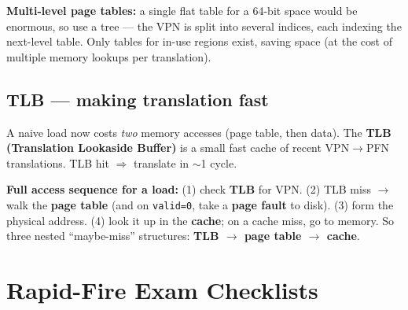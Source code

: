 \documentclass[10pt]{article}
\newcommand{\code}[1]{\texttt{\small #1}}
\begin{document}
\textbf{Multi-level page tables:} a single flat table for a 64-bit space would be enormous, so use
a tree --- the VPN is split into several indices, each indexing the next-level table. Only tables
for in-use regions exist, saving space (at the cost of multiple memory lookups per translation).

\subsection{TLB --- making translation fast}
\begin{keybox}
A naive load now costs \emph{two} memory accesses (page table, then data). The \textbf{TLB
(Translation Lookaside Buffer)} is a small fast cache of recent VPN$\to$PFN translations.
TLB hit $\Rightarrow$ translate in $\sim$1 cycle.
\end{keybox}

\begin{center}
\end{center}

\textbf{Full access sequence for a load:} (1) check \textbf{TLB} for VPN. (2) TLB miss $\to$ walk
the \textbf{page table} (and on \code{valid=0}, take a \textbf{page fault} to disk). (3) form the
physical address. (4) look it up in the \textbf{cache}; on a cache miss, go to memory.
So three nested ``maybe-miss'' structures: \textbf{TLB $\to$ page table $\to$ cache}.

\section{Rapid-Fire Exam Checklists}
\end{document}
